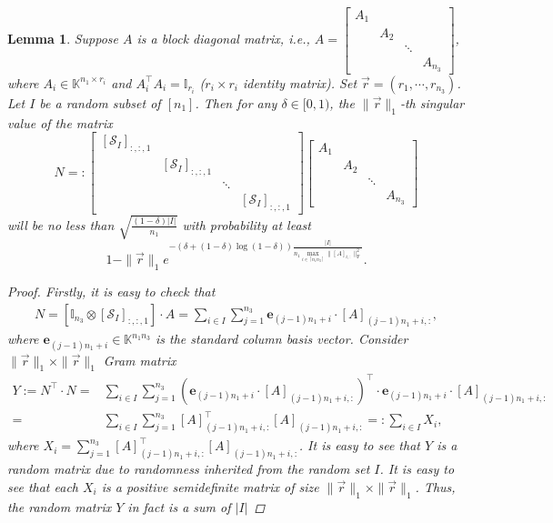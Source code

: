 \documentclass[twoside,12pt]{article}
\newtheorem{lemma}{Lemma}
\def\S{\mathcal{S}}
\def\fro{{\mathrm{F}}}
\def\S{\mathcal{S}}
\def\fro{{\mathrm{F}}}
\begin{document}
\begin{lemma}\label{lmm:key} 
Suppose $A$ is a block diagonal matrix, i.e., $A= 
\begin{bmatrix}
A_{1}  & && \\
& A_{2}  &&\\
& &\ddots & \\
& & &A_{n_3}
\end{bmatrix}$,   
  where  $A_i\in\mathbb{K}^{n_1\times r_i}$ and $A_{i}^{\top}A_{i} = \mathbb{I}_{r_i}$ ($r_i\times r_i$ identity matrix). Set $\vec{r}=(r_1,\cdots,r_{n_3})$. Let $I$ be a random subset of $[n_1]$.  Then for any $\delta\in [0,1)$, the $\|\vec{r}\|_1$-th   singular value of the matrix
\[N =:
\begin{bmatrix}
[\mathcal{S}_{I}]_{:,:,1}
 & & & \\
& [\mathcal{S}_{I}]_{:,:,1}& & \\
& & \ddots & \\
& & & [\mathcal{S}_{I}]_{:,:,1}
\end{bmatrix}
\begin{bmatrix}
A_{1}  & && \\
& A_{2}  &&\\
& &\ddots & \\
& & &A_{n_3}
\end{bmatrix}
\]
will be no less  than $\sqrt{\frac{(1-\delta)|I|}{n_1}}$ with probability at least 
\[1-\|\vec{r}\|_1e^{-(\delta+(1-\delta)\log(1-\delta))\frac{|I|}  {n_{1}\max_{i\in[n_1n_3]}{\|[A]_{i,:}\|_{\fro}^2}}}.\]
\begin{proof}
Firstly, it is easy to check that 
\begin{align*}
N=\left[\mathbb{I}_{n_3}\otimes[\S_{I}]_{:,:,1}\right]\cdot A =\sum\limits_{i \in I} \sum_{j=1}^{n_3} \mathbf{e}_{(j-1) n_1+i}\cdot [A]_{(j-1) n_1+i,:},
\end{align*}
where $\mathbf{e}_{(j-1) n_1+i}\in\mathbb{K}^{n_{1}n_3}$ is the standard column basis vector. 
Consider $\|\vec{r}\|_1\times \|\vec{r}\|_1$ Gram matrix
\begin{align*}
Y:= N^{\top}\cdot N
=&\sum_{i\in I}\sum_{j=1}^{n_3} (\mathbf{e}_{(j-1) n_1+i}\cdot [A]_{(j-1) n_1+i,:})^{\top}\cdot \mathbf{e}_{(j-1) n_1+i}\cdot [A]_{(j-1) n_1+i,:}\\
=&\sum_{i\in I}\sum_{j=1}^{n_3} [A]_{(j-1) n_1+i,:}^{\top} [A]_{(j-1) n_1+i,:}=:\sum_{i\in I} X_i,
\end{align*} 
where $X_i=\sum\limits_{j=1}^{n_3} [A]_{(j-1) n_1+i,:}^{\top} [A]_{(j-1) n_1+i,:}$. It is easy to see that $Y$ is a random matrix due to randomness inherited from the random set $I$. It is easy to see that each $X_i$ is a positive semidefinite matrix of size $\|\vec{r}\|_1\times \|\vec{r}\|_1$. Thus, the random matrix $Y$ in fact is a sum of $|I|$

\end{proof}
\end{lemma}
\end{document}
